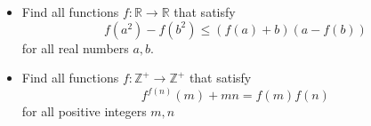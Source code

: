 \documentclass[11pt]{scrartcl}
\begin{document}
\begin{itemize}[label=,itemsep=0.4em,leftmargin=0em]
\begin{comment}
            Assume $f(p^{k-1}) = p^{k-1}$. From $(2)$ with $n = p^k$, we get $f(p^k) \mid p^k$. 
            
            On the other hand, from $(3)$ substituting $P(p^k, p^{k-1})$, we get $p^{k-1} \mid f(p^k)$. From this, we deduce $f(p^k) = p^k$.
        \end{pro}
        
        \vocab{Claim 4:} $f(m) = m, \forall m \in \mathbb{Z^+}$. According to the fundamental theorem of arithmetic, we decompose 
        \[
            m = p_1^{k_1}p_2^{k_2}\dots p_t^{k_t}
        \]
        where $p_1, p_2, \dots, p_t \in \mathbb{P}$ and $k_1, k_2, \dots \in \mathbb{Z^+}$. From $(3)$, we successively substitute $P(m, p_1^{k_1}), P(m, p_2^{k_2}), \dots, P(m, p_t^{k_t})$. On the other hand, we also have 
        \[
            (f(p_1^{k_1}), f(p_2^{k_2}), \dots, f(p_t^{k_t})) = 1
        \]
        Therefore, 
        \[
            f(p_1^{k_1}), f(p_2^{k_2}), \dots, f(p_t^{k_t}) \mid f(m)
        \]
        From $(2)$ with $n \to m$, we get 
        \[
            f(m) \mid f(p_1^{k_1}), f(p_2^{k_2}), \dots, f(p_t^{k_t}) 
        \]
        Hence, the unique function that satisfies the conditions is $\boxed{f(m) = m, \forall m \in \mathbb{Z^+}}$.

    \end{comment}
    \item \begin{btvn}
        Find all functions $f: \mathbb{R} \to \mathbb{R}$ that satisfy
        $$
        f\left(a^2\right)-f\left(b^2\right) \leq(f(a)+b)(a-f(b))
        $$
        for all real numbers  $a, b$.
    \end{btvn}
    \begin{comment}
        Let $P(a,b)$ denote the assertion for this functional inequality.
        $P(0,0)\implies (f(0))^2\leq 0$ and hence, $f(0)=0$.
        Now, $P(a,a)\implies (f(a))^2\leq a^2$.
        $P(0,a)$ and $P(a,0)$ gives $a\cdot f(a)=f(a^2)$ which basically gives $f(a)=-f(-a)$.
        $\newline$
        Now, Adding $P(a,-a)$ and $P(-a,a)$ gives $-2a^2\geq 2\cdot f(a)\cdot f(-a)=-2(f(a))^2\geq -2a^2\implies (f(a))^2=a^2\implies f(a)=\pm a$.
        Hence, $\boxed{f(x)=x}$ and $\boxed{f(x)=-x}$ are the solutions.
    \end{comment}
    \item \begin{btvn}
        Find all functions $f: \mathbb{Z^+} \to \mathbb{Z^+}$ that satisfy
        \[f^{f(n)}(m)+mn=f(m)f(n)\tag{1}\]
        for all positive integers $m,n$
    \end{btvn}
    \begin{comment}
        Denote $P(m,n)$ as the substitution into $(1)$. 


\end{comment}
\end{itemize}
\end{document}
